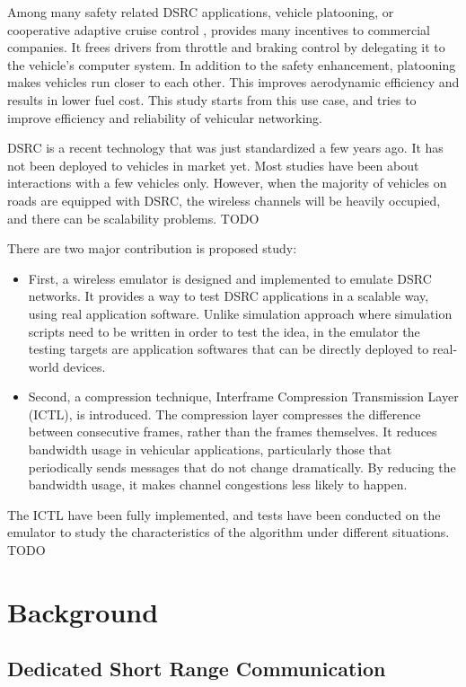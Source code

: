 \documentclass[12pt]{report}
\begin{document}
Among many safety related DSRC applications, vehicle platooning, or cooperative adaptive cruise control \cite{fhwa2015report}, provides many incentives to commercial companies. It frees drivers from throttle and braking control by delegating it to the vehicle's computer system. In addition to the safety enhancement, platooning makes vehicles run closer to each other. This improves aerodynamic efficiency and results in lower fuel cost. This study starts from this use case, and tries to improve efficiency and reliability of vehicular networking.

DSRC is a recent technology that was just standardized a few years ago. It has not been deployed to vehicles in market yet. Most studies have been about interactions with a few vehicles only. However, when the majority of vehicles on roads are equipped with DSRC, the wireless channels will be heavily occupied, and there can be scalability problems. TODO

There are two major contribution is proposed study:
\begin{itemize}
  \item First, a wireless emulator is designed and implemented to emulate DSRC networks. It provides a way to test DSRC applications in a scalable way, using real application software. Unlike simulation approach where simulation scripts need to be written in order to test the idea, in the emulator the testing targets are application softwares that can be directly deployed to real-world devices.
  \item Second, a compression technique, Interframe Compression Transmission Layer (ICTL), is introduced. The compression layer compresses the difference between consecutive frames, rather than the frames themselves. It reduces bandwidth usage in vehicular applications, particularly those that periodically sends messages that do not change dramatically. By reducing the bandwidth usage, it makes channel congestions less likely to happen.
\end{itemize}

The ICTL have been fully implemented, and tests have been conducted on the emulator to study the characteristics of the algorithm under different situations. TODO

\chapter{Background}

\section{Dedicated Short Range Communication}
\end{document}
